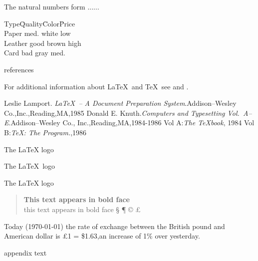 \documentclass[12pt,twoside,a4paper]{article}   %
\begin{document}
	\begin{axiom}
		The natural numbers form ......
	\end{axiom} 
	\begin{tabbing}
		Type\qquad\= Quality\quad\=
		Color\quad\= Price\\[0.8ex]
		Paper \> med. \>white \> low \\
		Leather \> good \> brown \> high\\
		Card	\> bad \> gray \> med.
	\end{tabbing}
	\begin{thebibliography}{+} %
		references
	\end{thebibliography}
	\newpage
	For additional information about \LaTeX\ and \TeX\ see \cite{lamport} and \cite{knuth, knuth:a}.
	\begin{thebibliography}{99}
		 Leslie Lamport. \textsl{\LaTeX\ -- A Document Preparation System}.Addison--Wesley Co.,Inc.,Reading,MA,1985
		 Donald E. Knuth.\textsl{Computers and Typesetting Vol.\ A--E}.Addison--Wesley Co., Inc.,Reading,MA,1984-1986
		 Vol A:\textsl{The \TeX book}, 1984
		 Vol B:\textsl{\TeX: The Program.},1986
	\end{thebibliography}
	\newpage
	The \LaTeX{} logo

	The \LaTeX\ logo

	The {\LaTeX} logo

	\begin{quote}
		{\bfseries This text appears in bold face}\\
		\setlength{\parindent}{0.5cm} this text appears in bold face
		\setlength{\textwidth}{12.5cm}
			\S 
			\ddag 
			\P
			\copyright 
			\pounds			
	\end{quote}
	Today (\today) the rate of exchange between the British pound and American dollar is \pounds 1 = \$1.63,an increase of 1\% over yesterday.

	\setlength{\parskip}{1.5ex} %
	\setlength{\parindent}{0em} %
	\renewcommand{\baselinestretch}{2} %
	\setlength{\textwidth}{12.5cm} %
	\begin{appendix}
		appendix text
	\end{appendix}
\end{document}
